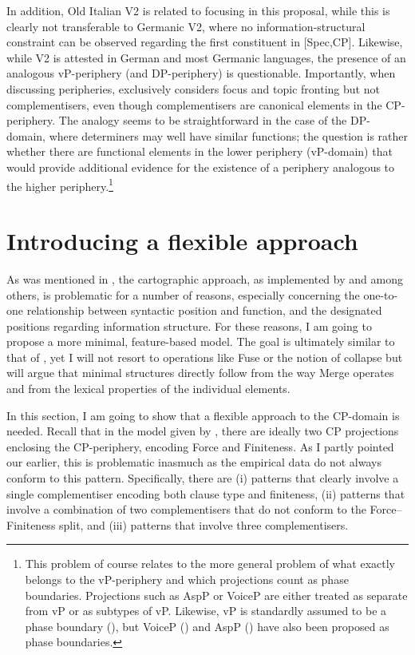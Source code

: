 In addition, Old Italian V2 is related to focusing in this proposal, while this is clearly not transferable to Germanic V2, where no information-structural constraint can be observed regarding the first constituent in [Spec,CP]. Likewise, while V2 is attested in German and most Germanic languages, the presence of an analogous vP-periphery (and DP-periphery) is questionable. Importantly, when discussing peripheries, \citet{poletto2006} exclusively considers focus and topic fronting but not complementisers, even though complementisers are canonical elements in the CP-periphery. The analogy seems to be straightforward in the case of the DP-domain, where determiners may well have similar functions; the question is rather whether there are functional elements in the lower periphery (vP-domain) that would provide additional evidence for the existence of a periphery analogous to the higher periphery.\footnote{This problem of course relates to the more general problem of what exactly belongs to the vP-periphery and which projections count as phase boundaries. Projections such as AspP or VoiceP are either treated as separate from vP or as subtypes of vP. Likewise, vP is standardly assumed to be a phase boundary (\citealt{chomsky2001}), but VoiceP (\citealt{baltin2007}) and AspP (\citealt{hinterhoelzl2006}) have also been proposed as phase boundaries.}

\section{Introducing a flexible approach} \label{sec:2introducing}
As was mentioned in , the cartographic approach, as implemented by \citet{rizzi1997, rizzi2004} and \citet{poletto2006} among others, is problematic for a number of reasons, especially concerning the one-to-one relationship between syntactic position and function, and the designated positions regarding information structure. For these reasons, I am going to propose a more minimal, feature-based model. The goal is ultimately similar to that of \citet{sobin2002}, yet I will not resort to operations like Fuse or the notion of collapse but will argue that minimal structures directly follow from the way Merge operates and from the lexical properties of the individual elements. 

In this section, I am going to show that a flexible approach to the CP-domain is needed. Recall that in the model given by \citet{rizzi1997, rizzi2004}, there are ideally two CP projections enclosing the CP-periphery, encoding Force and Finiteness. As I partly pointed our earlier, this is problematic inasmuch as the empirical data do not always conform to this pattern. Specifically, there are (i) patterns that clearly involve a single complementiser encoding both clause type and finiteness, (ii) patterns that involve a combination of two complementisers that do not conform to the Force--Finiteness split, and (iii) patterns that involve three complementisers.

